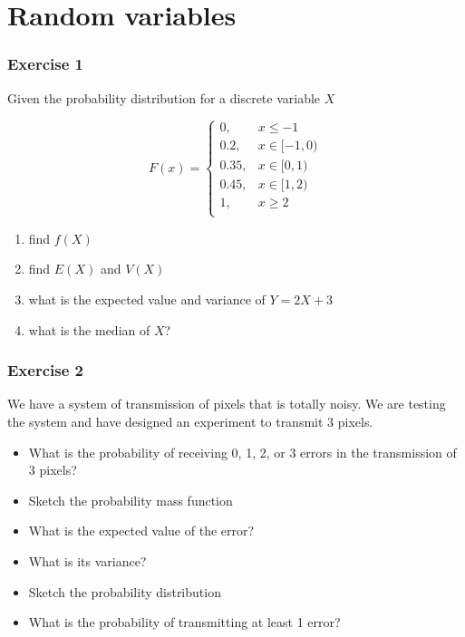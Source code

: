 \documentclass[
]{book}
\providecommand{\tightlist}{%
  \setlength{\itemsep}{0pt}\setlength{\parskip}{0pt}}
\begin{document}
\hypertarget{random-variables}{%
\section{Random variables}\label{random-variables}}

\hypertarget{exercise-1-3}{%
\subsubsection{Exercise 1}\label{exercise-1-3}}

Given the probability distribution for a discrete variable \(X\)

\[
    F(x)= 
\begin{cases}
0, & x \leq -1 \\
0.2,& x \in [-1,0)\\
0.35,& x \in [0,1)\\
0.45,& x \in [1,2)\\
1,& x \geq 2\\
\end{cases}
\]

\begin{enumerate}
\def\labelenumi{\alph{enumi})}
\tightlist
\item
  find \(f(X)\)
\item
  find \(E(X)\) and \(V(X)\)
\item
  what is the expected value and variance of \(Y=2X+3\)
\item
  what is the median of \(X\)?
\end{enumerate}

\hypertarget{exercise-2-3}{%
\subsubsection{Exercise 2}\label{exercise-2-3}}

We have a system of transmission of pixels that is totally noisy. We are testing the system and have designed an experiment to transmit 3 pixels.

\begin{itemize}
\item
  What is the probability of receiving 0, 1, 2, or 3 errors in the transmission of 3 pixels?
\item
  Sketch the probability mass function
\item
  What is the expected value of the error?
\item
  What is its variance?
\item
  Sketch the probability distribution
\item
  What is the probability of transmitting at least 1 error?
\end{itemize}
\end{document}

